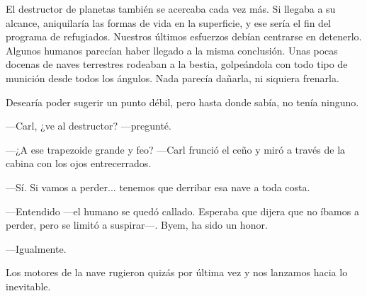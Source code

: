 El destructor de planetas también se acercaba cada vez más. Si llegaba a su alcance, aniquilaría las formas de vida en la superficie, y ese sería el fin del programa de refugiados. Nuestros últimos esfuerzos debían centrarse en detenerlo. Algunos humanos parecían haber llegado a la misma conclusión. Unas pocas docenas de naves terrestres rodeaban a la bestia, golpeándola con todo tipo de munición desde todos los ángulos. Nada parecía dañarla, ni siquiera frenarla.

Desearía poder sugerir un punto débil, pero hasta donde sabía, no tenía ninguno.

—Carl, ¿ve al destructor? —pregunté.

—¿A ese trapezoide grande y feo? —Carl frunció el ceño y miró a través de la cabina con los ojos entrecerrados.

—Sí. Si vamos a perder... tenemos que derribar esa nave a toda costa.

—Entendido —el humano se quedó callado. Esperaba que dijera que no íbamos a perder, pero se limitó a suspirar—. Byem, ha sido un honor.

—Igualmente.

Los motores de la nave rugieron quizás por última vez y nos lanzamos hacia lo inevitable.